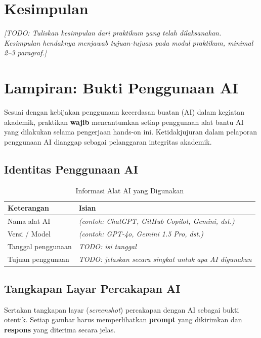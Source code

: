 \newpage
\section{Kesimpulan}

\noindent\textit{[TODO: Tuliskan kesimpulan dari praktikum yang telah dilaksanakan.
Kesimpulan hendaknya menjawab tujuan-tujuan pada modul praktikum, minimal 2--3 paragraf.]}

\newpage
\section{Lampiran: Bukti Penggunaan AI}
\label{sec:h01-lampiran-ai}

Sesuai dengan kebijakan penggunaan kecerdasan buatan (AI) dalam kegiatan akademik,
praktikan \textbf{wajib} mencantumkan setiap penggunaan alat bantu AI yang dilakukan
selama pengerjaan hands-on ini. Ketidakjujuran dalam pelaporan penggunaan AI dianggap
sebagai pelanggaran integritas akademik.

\subsection{Identitas Penggunaan AI}

\begin{table}[h]
\caption{Informasi Alat AI yang Digunakan}
\label{tab:h01-ai-info}
\centering
\begin{tabulary}{\textwidth}{|L|L|}
\hline
\textbf{Keterangan}   & \textbf{Isian} \\ \hline
Nama alat AI          & \textit{(contoh: ChatGPT, GitHub Copilot, Gemini, dst.)} \\ \hline
Versi / Model         & \textit{(contoh: GPT-4o, Gemini 1.5 Pro, dst.)} \\ \hline
Tanggal penggunaan    & \textit{TODO: isi tanggal} \\ \hline
Tujuan penggunaan     & \textit{TODO: jelaskan secara singkat untuk apa AI digunakan} \\ \hline
\end{tabulary}
\end{table}

\subsection{Tangkapan Layar Percakapan AI}

Sertakan tangkapan layar (\textit{screenshot}) percakapan dengan AI sebagai
bukti otentik. Setiap gambar harus memperlihatkan \textbf{prompt} yang dikirimkan
dan \textbf{respons} yang diterima secara jelas.

